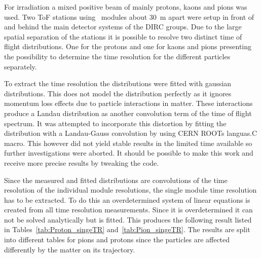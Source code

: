 \documentclass[../BTOF_summary.tex]{subfiles}
\begin{document}
For irradiation a mixed positive beam of mainly protons, kaons and pions was used.
Two ToF stations using \btof\ modules about \SI{30}{m} apart were setup in front of and behind the main detector systems of the DIRC groups.
Due to the large spatial separation of the stations it is possible to resolve two distinct time of flight distributions.
One for the protons and one for kaons and pions presenting the possibility to determine the time resolution for the different particles separately.

To extract the time resolution the distributions were fitted with gaussian distributions.
This does not model the distribution perfectly as it ignores momentum loss effects due to particle interactions in matter.
These interactions produce a Landau distribution as another convolution term of the time of flight spectrum.
It was attempted to incorporate this distortion by fitting the distribution with a Landau-Gauss convolution by using CERN ROOTs languas.C macro.
This however did not yield stable results in the limited time available so further investigations were aborted.
It should be possible to make this work and receive more precise results by tweaking the code.

Since the measured and fitted distributions are convolutions of the time resolution of the individual module resolutions, the single module time resolution has to be extracted.
To do this an overdetermined system of linear equations is created from all time resolution measurements.
Since it is overdetermined it can not be solved analytically but is fitted.
This produces the following result listed in Tables~\ref{tab:Proton_singeTR} and~\ref{tab:Pion_singeTR}.
The results are split into different tables for pions and protons since the particles are affected differently by the matter on its trajectory.
\end{document}
